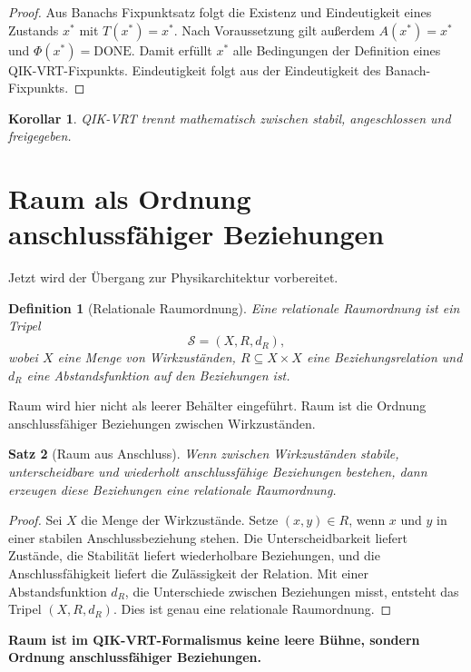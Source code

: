 \documentclass[11pt,a4paper,oneside]{scrartcl}
\theoremstyle{qikstyle}
\newtheorem{definition}{Definition}[section]
\newtheorem{satz}{Satz}[section]
\newtheorem{korollar}[satz]{Korollar}
\newcommand{\DONE}{\mathrm{DONE}}
\newcommand{\Phiop}{\Phi}
\newenvironment{merksatz}{\begin{center}\begin{minipage}{0.92\linewidth}\sffamily\bfseries}{\end{minipage}\end{center}}
\begin{document}
\begin{proof}
Aus Banachs Fixpunktsatz folgt die Existenz und Eindeutigkeit eines Zustands \(x^*\) mit \(T(x^*)=x^*\). Nach Voraussetzung gilt außerdem \(A(x^*)=x^*\) und \(\Phiop(x^*)=\DONE\). Damit erfüllt \(x^*\) alle Bedingungen der Definition eines QIK-VRT-Fixpunkts. Eindeutigkeit folgt aus der Eindeutigkeit des Banach-Fixpunkts.
\end{proof}

\begin{korollar}
QIK-VRT trennt mathematisch zwischen stabil, angeschlossen und freigegeben.
\end{korollar}
\newpage

\section{Raum als Ordnung anschlussfähiger Beziehungen}

Jetzt wird der Übergang zur Physikarchitektur vorbereitet.

\begin{definition}[Relationale Raumordnung]
Eine relationale Raumordnung ist ein Tripel
\[
\mathcal{S}=(X,R,d_R),
\]
wobei \(X\) eine Menge von Wirkzuständen, \(R\subseteq X\times X\) eine Beziehungsrelation und \(d_R\) eine Abstandsfunktion auf den Beziehungen ist.
\end{definition}

Raum wird hier nicht als leerer Behälter eingeführt. Raum ist die Ordnung anschlussfähiger Beziehungen zwischen Wirkzuständen.

\begin{satz}[Raum aus Anschluss]
Wenn zwischen Wirkzuständen stabile, unterscheidbare und wiederholt anschlussfähige Beziehungen bestehen, dann erzeugen diese Beziehungen eine relationale Raumordnung.
\end{satz}

\begin{proof}
Sei \(X\) die Menge der Wirkzustände. Setze \((x,y)\in R\), wenn \(x\) und \(y\) in einer stabilen Anschlussbeziehung stehen. Die Unterscheidbarkeit liefert Zustände, die Stabilität liefert wiederholbare Beziehungen, und die Anschlussfähigkeit liefert die Zulässigkeit der Relation. Mit einer Abstandsfunktion \(d_R\), die Unterschiede zwischen Beziehungen misst, entsteht das Tripel \((X,R,d_R)\). Dies ist genau eine relationale Raumordnung.
\end{proof}

\begin{merksatz}
Raum ist im QIK-VRT-Formalismus keine leere Bühne, sondern Ordnung anschlussfähiger Beziehungen.
\end{merksatz}
\newpage
\end{document}
